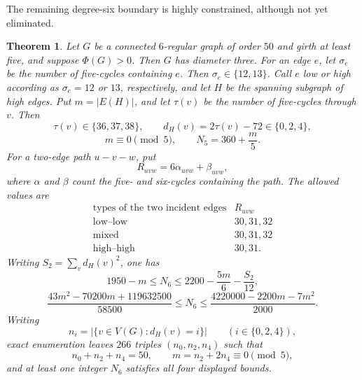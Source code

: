 \documentclass[a4paper,10pt,reqno]{amsart}
\theoremstyle{plain}
\newtheorem{theorem}{Theorem}[section]
\theoremstyle{definition}
\theoremstyle{remark}
\begin{document}
The remaining degree-six boundary is highly constrained, although not yet
eliminated.

\begin{theorem}\label{thm:order50-feasibility}
Let \(G\) be a connected \(6\)-regular graph of order \(50\) and girth
at least five, and suppose \(\Phi(G)>0\).  Then \(G\) has diameter three.
For an edge \(e\), let \(\sigma_e\) be the number of five-cycles containing
\(e\).  Then \(\sigma_e\in\{12,13\}\).  Call \(e\) low or high according as
\(\sigma_e=12\) or \(13\), respectively, and let \(H\) be the spanning
subgraph of high edges.  Put \(m=|E(H)|\), and let \(\tau(v)\) be the number
of five-cycles through \(v\).  Then
\[
 \tau(v)\in\{36,37,38\},
 \qquad d_H(v)=2\tau(v)-72\in\{0,2,4\},
\]
\[
 m\equiv0\pmod5,
 \qquad N_5=360+\frac m5.
\]
For a two-edge path \(u-v-w\), put
\[
 R_{uvw}=6\alpha_{uvw}+\beta_{uvw},
\]
where \(\alpha\) and \(\beta\) count the five- and six-cycles containing the
path.  The allowed values are
\[
\begin{array}{c|c}
\text{types of the two incident edges}&R_{uvw}\\
\hline
\text{low--low}&30,31,32\\
\text{mixed}&30,31,32\\
\text{high--high}&30,31.
\end{array}
\]
Writing \(S_2=\sum_vd_H(v)^2\), one has
\[
 1950-m\le N_6
 \le2200-\frac{5m}{6}-\frac{S_2}{12},
\]
\[
 \frac{43m^2-70200m+119632500}{58500}
 \le N_6
 \le\frac{4220000-2200m-7m^2}{2000}.
\]
Writing
\[
 n_i=\bigl|\{v\in V(G):d_H(v)=i\}\bigr|
 \qquad(i\in\{0,2,4\}),
\]
exact enumeration leaves \(266\) triples \((n_0,n_2,n_4)\) such that
\[
 n_0+n_2+n_4=50,\qquad
 m=n_2+2n_4\equiv0\pmod5,
\]
and at least one integer \(N_6\) satisfies all four displayed bounds.
\end{theorem}
\end{document}
